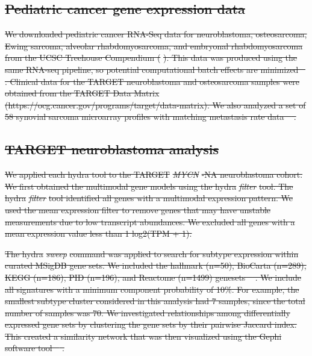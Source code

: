 \documentclass[10pt,letterpaper]{article}
\providecommand{\DIFdeltex}[1]{{\protect\color{red}\sout{#1}}}                      %
\providecommand{\DIFdel}[1]{\texorpdfstring{\DIFdeltex{#1}}{}} %
\begin{document}
\subsection*{\DIFdel{Pediatric cancer gene expression data}}
\DIFdel{We downloaded pediatric cancer RNA-Seq data for neuroblastoma, osteosarcoma, Ewing sarcoma, alveolar rhabdomyosarcoma, and embryonal rhabdomyosarcoma from the UCSC Treehouse Compendium (}%
\DIFdel{). This data was produced using the same RNA-seq pipeline, so potential computational batch effects are minimized \mbox{%
\cite{vivianToilEnablesReproducible2017,vaskeComparativeTumorRNA2019}}\hspace{0pt}%
. Clinical data for the TARGET neuroblastoma and osteosarcoma samples were obtained from the TARGET Data Matrix (https://ocg.cancer.gov/programs/target/data-matrix). We also analyzed a set of 58 synovial sarcoma microarray profiles with matching metastasis rate data \mbox{%
\cite{lagardeChromosomeInstabilityAccounts2013}}\hspace{0pt}%
.
}%

\subsection*{\DIFdel{TARGET neuroblastoma analysis}}
\DIFdel{We applied each hydra tool to the TARGET }\textit{\DIFdel{MYCN}}%
\DIFdel{-NA neuroblastoma cohort. We first obtained the multimodal gene models using the hydra }\textit{\DIFdel{filter}} %
\DIFdel{tool. The hydra }\textit{\DIFdel{filter}} %
\DIFdel{tool identified all genes with a multimodal expression pattern. We used the mean expression filter to remove genes that may have unstable measurements due to low transcript abundances. We excluded all genes with a mean expression value less than 1 log2(TPM + 1).
}%

\DIFdel{The hydra }\textit{\DIFdel{sweep}} %
\DIFdel{command was applied to search for subtype expression within curated MSigDB gene sets. We included the hallmark (n=50), BioCarta (n=289), KEGG (n=186), PID (n=196), and Reactome (n=1499) genesets \mbox{%
\cite{liberzonMolecularSignaturesDatabase2011}}\hspace{0pt}%
. We include all signatures with a minimum component probability of 10\%. For example, the smallest subtype cluster considered in this analysis had 7 samples, since the total number of samples was 70. We investigated relationships among differentially expressed gene sets by clustering the gene sets by their pairwise Jaccard index. This created a similarity network that was then visualized using the Gephi software tool \mbox{%
\cite{bastian2009gephi}}\hspace{0pt}%
.
}%
\end{document}
